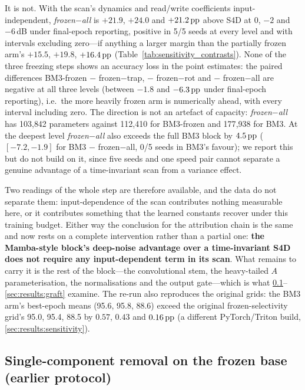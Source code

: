 It is not. With the scan's dynamics and read/write coefficients input-independent, \emph{frozen$-$all} is $+21.9$, $+24.0$ and $+21.2\,\mathrm{pp}$ above S4D at $0$, $-2$ and $-6$\,dB under final-epoch reporting, positive in 5/5 seeds at every level and with intervals excluding zero---if anything a larger margin than the partially frozen arm's $+15.5$, $+19.8$, $+16.4\,\mathrm{pp}$ (Table~\ref{tab:sensitivity_contrasts}). None of the three freezing steps shows an accuracy loss in the point estimates: the paired differences BM3-frozen $-$ frozen$-$trap, $-$ frozen$-$rot and $-$ frozen$-$all are negative at all three levels (between $-1.8$ and $-6.3\,\mathrm{pp}$ under final-epoch reporting), i.e.\ the more heavily frozen arm is numerically ahead, with every interval including zero. The direction is not an artefact of capacity: \emph{frozen$-$all} has 103{,}842 parameters against 112{,}410 for BM3-frozen and 177{,}938 for BM3. At the deepest level \emph{frozen$-$all} also exceeds the full BM3 block by $4.5\,\mathrm{pp}$ ($[-7.2, -1.9]$ for BM3 $-$ frozen$-$all, 0/5 seeds in BM3's favour); we report this but do not build on it, since five seeds and one speed pair cannot separate a genuine advantage of a time-invariant scan from a variance effect.

Two readings of the whole step are therefore available, and the data do not separate them: input-dependence of the scan contributes nothing measurable here, or it contributes something that the learned constants recover under this training budget. Either way the conclusion for the attribution chain is the same and now rests on a complete intervention rather than a partial one: \textbf{the Mamba-style block's deep-noise advantage over a time-invariant S4D does not require any input-dependent term in its scan}. What remains to carry it is the rest of the block---the convolutional stem, the heavy-tailed $A$ parameterisation, the normalisations and the output gate---which is what \ref{sec:results:localise}--\ref{sec:results:graft} examine. The re-run also reproduces the original grids: the BM3 arm's best-epoch means (95.6, 95.8, 88.6) exceed the original frozen-selectivity grid's 95.0, 95.4, 88.5 by $0.57$, $0.43$ and $0.16\,\mathrm{pp}$ (a different PyTorch/Triton build, \ref{sec:results:sensitivity}).

\subsection{Single-component removal on the frozen base (earlier protocol)}
\label{sec:results:localise}

